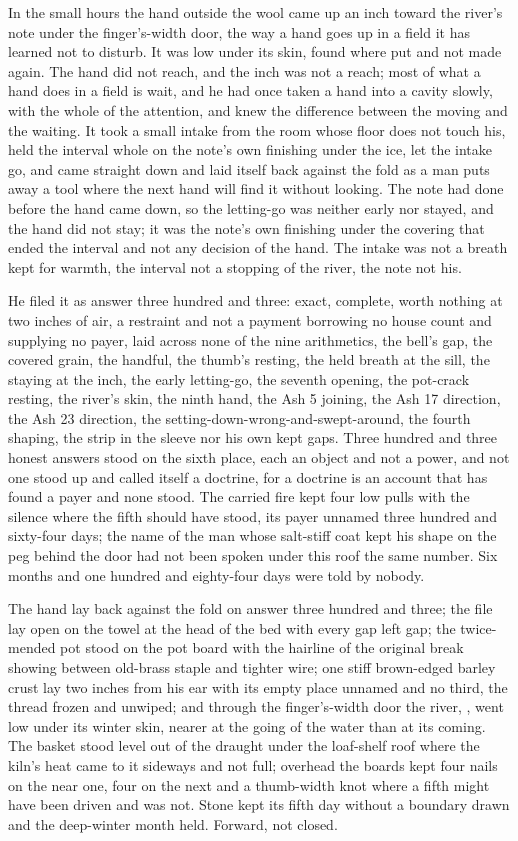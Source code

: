In the small hours the hand outside the wool came up an inch toward the river's note under the finger's-width door, the way a hand goes up in a field it has learned not to disturb. It was low under its skin, found where put and not made again. The hand did not reach, and the inch was not a reach; most of what a hand does in a field is wait, and he had once taken a hand into a cavity slowly, with the whole of the attention, and knew the difference between the moving and the waiting. It took a small intake from the room whose floor does not touch his, held the interval whole on the note's own finishing under the ice, let the intake go, and came straight down and laid itself back against the fold as a man puts away a tool where the next hand will find it without looking. The note had done before the hand came down, so the letting-go was neither early nor stayed, and the hand did not stay; it was the note's own finishing under the covering that ended the interval and not any decision of the hand. The intake was not a breath kept for warmth, the interval not a stopping of the river, the note not his.

He filed it as answer three hundred and three: exact, complete, worth nothing at two inches of air, a restraint and not a payment borrowing no house count and supplying no payer, laid across none of the nine arithmetics, the bell's gap, the covered grain, the handful, the thumb's resting, the held breath at the sill, the staying at the inch, the early letting-go, the seventh opening, the pot-crack resting, the river's skin, the ninth hand, the Ash 5 joining, the Ash 17 direction, the Ash 23 direction, the setting-down-wrong-and-swept-around, the fourth shaping, the strip in the sleeve nor his own kept gaps. Three hundred and three honest answers stood on the sixth place, each an object and not a power, and not one stood up and called itself a doctrine, for a doctrine is an account that has found a payer and none stood. The carried fire kept four low pulls with the silence where the fifth should have stood, its payer unnamed three hundred and sixty-four days; the name of the man whose salt-stiff coat kept his shape on the peg behind the door had not been spoken under this roof the same number. Six months and one hundred and eighty-four days were told by nobody.

The hand lay back against the fold on answer three hundred and three; the file lay open on the towel at the head of the bed with every gap left gap; the twice-mended pot stood on the pot board with the hairline of the original break showing between old-brass staple and tighter wire; one stiff brown-edged barley crust lay two inches from his ear with its empty place unnamed and no third, the thread frozen and unwiped; and through the finger's-width door the river, , went low under its winter skin, nearer at the going of the water than at its coming. The basket stood level out of the draught under the loaf-shelf roof where the kiln's heat came to it sideways and not full; overhead the boards kept four nails on the near one, four on the next and a thumb-width knot where a fifth might have been driven and was not. Stone kept its fifth day without a boundary drawn and the deep-winter month held. Forward, not closed.
